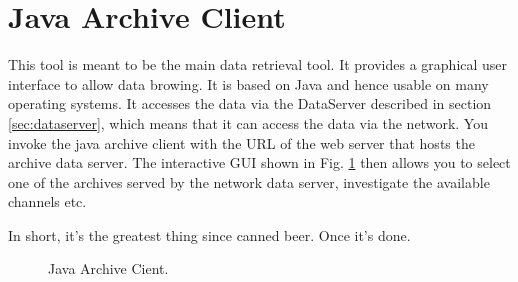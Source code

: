 \section{Java Archive Client} \label{sec:javaclient}
This tool is meant to be the main data retrieval tool. It provides a
graphical user interface to allow data browing. It is based on Java
and hence usable on many operating systems. It accesses the data via
the DataServer described in section \ref{sec:dataserver}, which means
that it can access the data via the network.  You invoke the java
archive client with the URL of the web server that hosts the archive
data server. The interactive GUI shown in Fig. \ref{fig:javatool} then
allows you to select one of the archives served by the network data
server, investigate the available channels etc.

In short, it's the greatest thing since canned beer. Once it's done.
\medskip

\begin{figure}[htb]
\begin{center}
\end{center}
\caption{\label{fig:javatool}Java Archive Cient.}
\end{figure}
